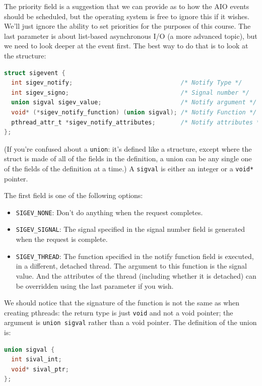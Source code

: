 \documentclass[a4paper]{report}
\begin{document}
The priority field is a suggestion that we can provide as to how the AIO events should be scheduled, but the operating system is free to ignore this if it wishes. We'll just ignore the ability to set priorities for the purposes of this course. The last parameter is about list-based asynchronous I/O (a more advanced topic), but we need to look deeper at the event first. The best way to do that is to look at the structure:

\begin{lstlisting}[language=C]
struct sigevent {
  int sigev_notify;                              /* Notify Type */
  int sigev_signo;                               /* Signal number */
  union sigval sigev_value;                      /* Notify argument */
  void* (*sigev_notify_function) (union sigval); /* Notify Function */
  pthread_attr_t *sigev_notify_attributes;       /* Notify attributes */
};
\end{lstlisting}

(If you're confused about a \texttt{union}: it's defined like a structure, except where the struct is made of all of the fields in the definition, a union can be any single one of the fields of the definition at a time.) A \texttt{sigval} is either an integer or a \texttt{void*} pointer.

The first field is one of the following options:
\begin{itemize}
	\item \texttt{SIGEV\_NONE}: Don't do anything when the request completes.
	\item \texttt{SIGEV\_SIGNAL}: The signal specified in the signal number field is generated when the request is complete.
	\item \texttt{SIGEV\_THREAD}: The function specified in the notify function field is executed, in a different, detached thread. The argument to this function is the signal value. And the attributes of the thread (including whether it is detached) can be overridden using the last parameter if you wish.
\end{itemize}

We should notice that the signature of the function is not the same as when creating pthreads: the return type is just \texttt{void} and not a void pointer; the argument is \texttt{union sigval} rather than a void pointer. The definition of the union is:

\begin{lstlisting}[language=C]
union sigval {
  int sival_int;
  void* sival_ptr;
};
\end{lstlisting}
\end{document}
